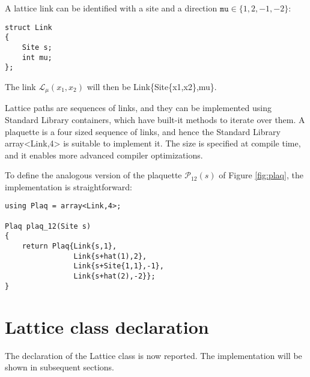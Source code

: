 A lattice link can be identified with a site and a direction $\texttt{mu} \in \{1,2,-1,-2\}$:
\begin{lstlisting}[caption={Link type}]
struct Link
{
    Site s;
    int mu;
};
\end{lstlisting}
The link $\mathcal L_\mu(x_1,x_2)$ will then be {\ttfamily Link\{Site\{x1,x2\},mu\}}.


Lattice paths are sequences of links, and they can be implemented using Standard Library containers, which have built-it methods to iterate over them.
A plaquette is a four sized sequence of links, and hence the Standard Library {\ttfamily array<Link,4>} is suitable to implement it.
The size is specified at compile time,
and it enables more advanced compiler optimizations.

To define the analogous version of the plaquette $\mathcal P_{12}(s)$ of Figure \ref{fig:plaq}, the implementation is straightforward:
\begin{lstlisting}[caption={Plaquette type}]
using Plaq = array<Link,4>;

Plaq plaq_12(Site s)
{
    return Plaq{Link{s,1},
                Link{s+hat(1),2},
                Link{s+Site{1,1},-1},
                Link{s+hat(2),-2}};
}
\end{lstlisting}

\section{Lattice class declaration}

The declaration of the {\ttfamily Lattice} class is now reported.
The implementation will be shown in subsequent sections.

